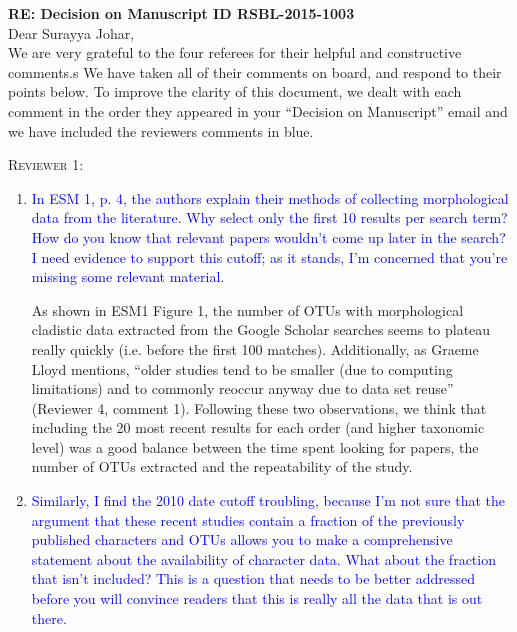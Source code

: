 \documentclass[12pt,letterpaper]{article}
\renewcommand{\section}[1]{%
\bigskip
\begin{center}
\begin{Large}
\normalfont\scshape #1
\medskip
\end{Large}
\end{center}}
\begin{document}
\textbf{RE: Decision on Manuscript ID RSBL-2015-1003}\\
\bigskip
Dear Surayya Johar,\\
\bigskip
We are very grateful to the four referees for their helpful and constructive comments.s
We have taken all of their comments on board, and respond to their points below. To improve the clarity of this document, we dealt with each comment in the order they appeared in your ``Decision on Manuscript'' email and we have included the reviewers comments in blue.


\section{Reviewer 1:}
\begin{enumerate}
\item{\textcolor{blue}{In ESM 1, p. 4, the authors explain their methods of collecting morphological data from the literature. Why select only the first 10 results per search term? How do you know that relevant papers wouldn't come up later in the search? I need evidence to support this cutoff; as it stands, I'm concerned that you're missing some relevant material.}}

As shown in ESM1 Figure 1, the number of OTUs with morphological cladistic data extracted from the Google Scholar searches seems to plateau really quickly (i.e. before the first 100 matches).
Additionally, as Graeme Lloyd mentions, ``older studies tend to be smaller (due to computing limitations) and to commonly reoccur anyway due to data set reuse'' (Reviewer 4, comment 1).
Following these two observations, we think that including the 20 most recent results %
 for each order (and higher taxonomic level) was a good balance between the time spent looking for papers, the number of OTUs extracted and the repeatability of the study.

\item{\textcolor{blue}{Similarly, I find the 2010 date cutoff troubling, because I'm not sure that the argument that these recent studies contain a fraction of the previously published characters and OTUs allows you to make a comprehensive statement about the availability of character data. What about the fraction that isn't included? This is a question that needs to be better addressed before you will convince readers that this is really all the data that is out there.}}


\end{enumerate}
\end{document}
